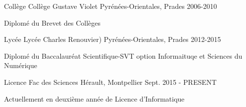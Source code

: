 


\begin{cventries}


\cventry
{Collège} %
{Collège Gustave Violet} %
{Pyrénées-Orientales, Prades} %
{2006-2010} %
{ %
\begin{cvitems}
\item {Diplomé du Brevet des Collèges}
\end{cvitems}
}

\cventry
{Lycée} %
{Lycée Charles Renouvier)} %
{Pyrénées-Orientales, Prades} %
{2012-2015} %
{ %
\begin{cvitems}
\item {Diplomé du Baccalauréat Scientifique-SVT option Informaituqe et Sciences du Numérique}
\end{cvitems}
}

\cventry
{Licence} %
{Fac des Sciences} %
{Hérault, Montpellier} %
{Sept. 2015 - PRESENT} %
{ %
\begin{cvitems}
\item {Actuellement en deuxième année de Licence d'Informatique}
\end{cvitems}
}


\end{cventries}
